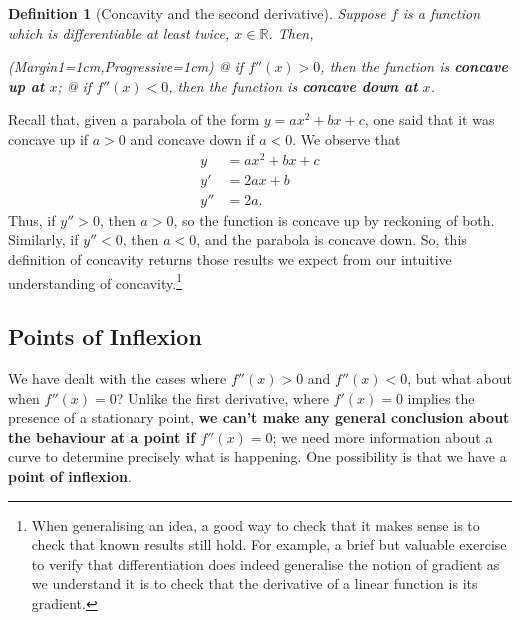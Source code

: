 \documentclass[a4paper,11pt]{article}
\newcommand{\R}{\mathbb{R}}
\newtheorem*{definition*}{Definition}
\begin{document}
\begin{definition*}[Concavity and the second derivative]
	Suppose $f$ is a function which is differentiable at least twice, $x\in\R$. Then, 
	\vspace{0.15cm}
	\begin{easylist}[itemize]
		\ListProperties(Margin1=1cm,Progressive=1cm)
		@ if $f''(x) > 0$, then the function is \textbf{concave up at} $x$;
		@ if $f''(x) < 0$, then the function is \textbf{concave down at} $x$.
	\end{easylist}
\vspace{0.15cm}
\end{definition*}
\begin{figure}[H]
	\centering
\end{figure}
Recall that, given a parabola of the form $y=ax^2+bx+c$, one said that it was concave up if $a>0$ and concave down if $a<0$. We observe that
\begin{align*}
y &= ax^2+bx+c\\
y' &= 2ax+b\\
y'' &= 2a.
\end{align*}
Thus, if $y''>0$, then $a>0$, so the function is concave up by reckoning of both. Similarly, if $y''<0$, then $a<0$, and the parabola is concave down. So, this definition of concavity returns those results we expect from our intuitive understanding of concavity.\footnote{When generalising an idea, a good way to check that it makes sense is to check that known results still hold. For example, a brief but valuable exercise to verify that differentiation does indeed generalise the notion of gradient as we understand it is to check that the derivative of a linear function is its gradient.}

\subsection*{Points of Inflexion}
We have dealt with the cases where $f''(x)>0$ and $f''(x)<0$, but what about when $f''(x)=0$? Unlike the first derivative, where $f'(x)=0$ implies the presence of a stationary point,\textbf{ we can't make any general conclusion about the behaviour at a point if $f''(x)=0$}; we need more information about a curve to determine precisely what is happening. One possibility is that we have a \textbf{point of inflexion}.
\end{document}
